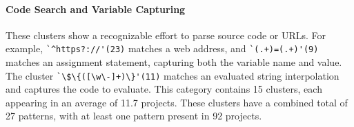 \paragraph{Code Search and Variable Capturing}
\label{cluster:search}
These clusters show a recognizable effort to parse source code or URLs. For example,
\verb!`^https?://'(23)! matches a web address, and \verb!`(.+)=(.+)'(9)! matches an assignment statement, capturing both the variable name and value.
The cluster  \verb!`\$\{([\w\-]+)\}'(11)! matches an evaluated string interpolation and captures the code to evaluate.
This category contains 15 clusters, each appearing in an average of 11.7 projects.
These clusters have a combined total of 27 patterns, with at least one pattern present in 92 projects.
